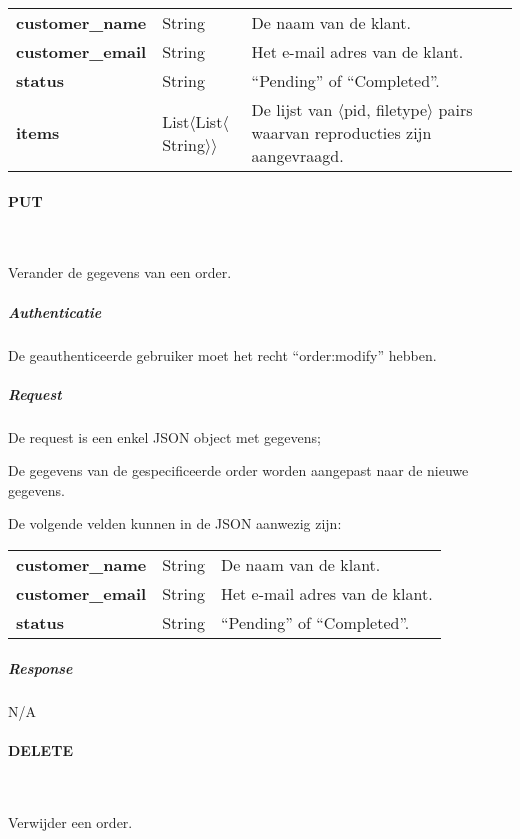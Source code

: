 \documentclass[a4paper,titlepage]{report}
\makeatletter
\def\namedlabel#1#2{
  \label{#1}
  \begingroup
   \def\@currentlabel{#2}%
   \label{#1:name}\endgroup
}
\makeatother
\begin{document}
            \begin{tabular}{ l l p{8cm} }
              \textbf{customer\_name} & String & De naam van de klant. \\
              \textbf{customer\_email} & String & Het e-mail adres van de
              klant. \\
              \textbf{status} & String & ``Pending'' of ``Completed''. \\
              \textbf{items} & List$\langle$List$\langle$String$\rangle\rangle$ & De lijst van
              $\langle$pid, filetype$\rangle$ pairs waarvan reproducties zijn aangevraagd.\\
            \end{tabular}

        \paragraph{PUT}\hfill\\
          \namedlabel{api:order:put}{PUT /order/[id]}
          Verander de gegevens van een order.

          \subparagraph{Authenticatie}
            De geauthenticeerde gebruiker moet het recht ``order:modify''
            hebben.

          \subparagraph{Request}
            De request is een enkel JSON object met gegevens;

            De gegevens van de gespecificeerde order worden aangepast
            naar de nieuwe gegevens.

            De volgende velden kunnen in de JSON aanwezig zijn:\\

            \begin{tabular}{ l l p{8cm} }
              \textbf{customer\_name} & String & De naam van de klant. \\
              \textbf{customer\_email} & String & Het e-mail adres van de
              klant. \\
              \textbf{status} & String & ``Pending'' of ``Completed''. \\
            \end{tabular}

          \subparagraph{Response} N/A

        \paragraph{DELETE}\hfill\\
          \namedlabel{api:order:delete}{DELETE /order/[id]}
          Verwijder een order.
\end{document}
